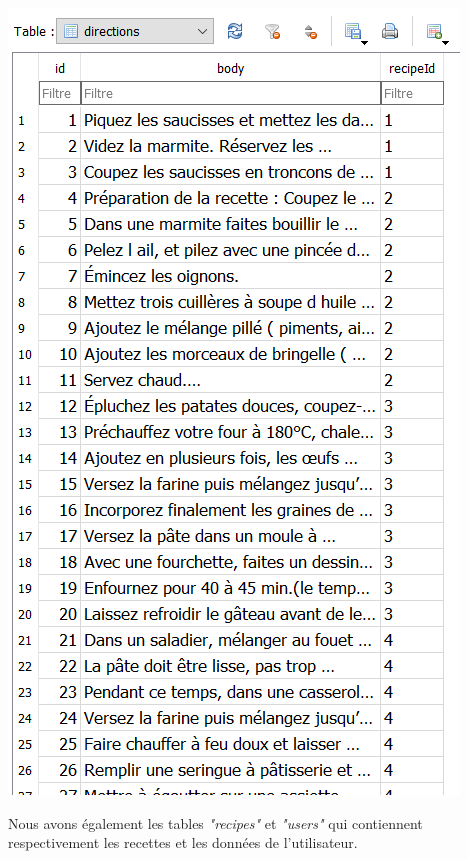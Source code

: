 \documentclass{article}
\begin{document}
\newpage

\begin{center}
    \includegraphics[scale=0.4]{directions.png} 
\end{center}

Nous avons également les tables \textit{"recipes"} et \textit{"users"} qui contiennent respectivement les recettes et les données de l’utilisateur.
\end{document}

